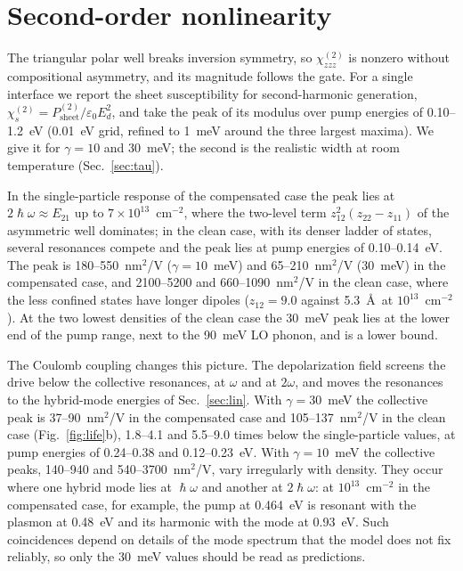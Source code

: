 \documentclass[11pt]{article}
\begin{document}
\section{Second-order nonlinearity}\label{sec:chi2}
The triangular polar well breaks inversion symmetry, so $\chi^{(2)}_{zzz}$ is nonzero without compositional asymmetry, and its magnitude follows the gate. For a single interface we report the sheet susceptibility for second-harmonic generation, $\chi^{(2)}_s=P^{(2)}_\mathrm{sheet}/\varepsilon_0E_d^2$, and take the peak of its modulus over pump energies of 0.10--1.2~eV (0.01~eV grid, refined to 1~meV around the three largest maxima). We give it for $\gamma=10$ and 30~meV; the second is the realistic width at room temperature (Sec.~\ref{sec:tau}).

In the single-particle response of the compensated case the peak lies at $2\hslash\omega\approx E_{21}$ up to $7\times10^{13}$~cm$^{-2}$, where the two-level term $z_{12}^2(z_{22}-z_{11})$ of the asymmetric well dominates; in the clean case, with its denser ladder of states, several resonances compete and the peak lies at pump energies of 0.10--0.14~eV. The peak is 180--550~nm$^2$/V ($\gamma=10$~meV) and 65--210~nm$^2$/V (30~meV) in the compensated case, and 2100--5200 and 660--1090~nm$^2$/V in the clean case, where the less confined states have longer dipoles ($z_{12}=9.0$ against 5.3~\AA\ at $10^{13}$~cm$^{-2}$). At the two lowest densities of the clean case the 30~meV peak lies at the lower end of the pump range, next to the 90~meV LO phonon, and is a lower bound.

The Coulomb coupling changes this picture. The depolarization field screens the drive below the collective resonances, at $\omega$ and at $2\omega$, and moves the resonances to the hybrid-mode energies of Sec.~\ref{sec:lin}. With $\gamma=30$~meV the collective peak is 37--90~nm$^2$/V in the compensated case and 105--137~nm$^2$/V in the clean case (Fig.~\ref{fig:life}b), 1.8--4.1 and 5.5--9.0 times below the single-particle values, at pump energies of 0.24--0.38 and 0.12--0.23~eV. With $\gamma=10$~meV the collective peaks, 140--940 and 540--3700~nm$^2$/V, vary irregularly with density. They occur where one hybrid mode lies at $\hslash\omega$ and another at $2\hslash\omega$: at $10^{13}$~cm$^{-2}$ in the compensated case, for example, the pump at 0.464~eV is resonant with the plasmon at 0.48~eV and its harmonic with the mode at 0.93~eV. Such coincidences depend on details of the mode spectrum that the model does not fix reliably, so only the 30~meV values should be read as predictions.
\end{document}
